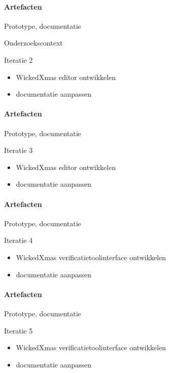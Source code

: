 \begin{enumerate}
\begin{itemize}
		\paragraph{\gray Artefacten}
{\gray		Prototype, documentatie
		\item Onderzoekscontext
	\item Iteratie 2
		\begin{itemize}
		\item WickedXmas editor ontwikkelen
		\item documentatie aanpassen
		\end{itemize}
		}%
		\paragraph{\gray Artefacten}
{\gray		Prototype, documentatie
	\item Iteratie 3
		\begin{itemize}
		\item WickedXmas editor ontwikkelen
		\item documentatie aanpassen
		\end{itemize}
		}%
		\paragraph{\gray Artefacten}
{\gray		Prototype, documentatie
	\item Iteratie 4
		\begin{itemize}
		\item WickedXmas verificatietoolinterface ontwikkelen
		\item documentatie aanpassen
		\end{itemize}
		}%
		\paragraph{\gray Artefacten}
{\gray		Prototype, documentatie
	\item Iteratie 5
		\begin{itemize}
			\item WickedXmas verificatietoolinterface ontwikkelen
			\item documentatie aanpassen
		\end{itemize}
		}%

\end{itemize}
\end{enumerate}

